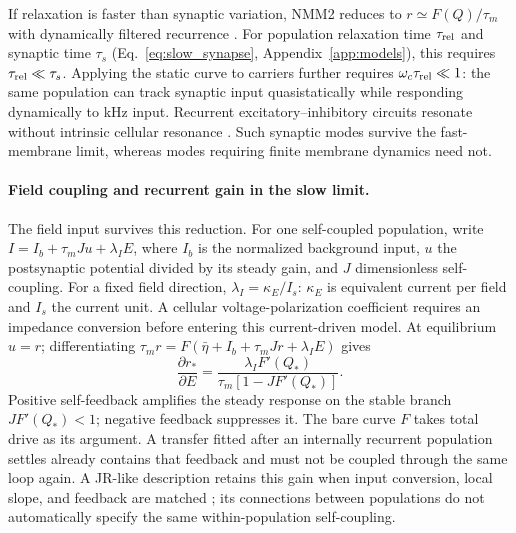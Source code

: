 If relaxation is faster than synaptic variation, NMM2 reduces to
$r\simeq F(Q)/\tau_m$ with dynamically filtered recurrence
\cite{ruffini2021nmm2,clusella2023}. For population relaxation time
$\tau_{\rm rel}$ and synaptic time $\tau_s$ (Eq.~\eqref{eq:slow_synapse},
Appendix~\ref{app:models}), this requires $\tau_{\rm rel}\ll\tau_s$.
Applying the static curve to carriers further requires
$\omega_c\tau_{\rm rel}\ll1$: the same population can track synaptic
input quasistatically while responding dynamically to kHz input.
Recurrent excitatory--inhibitory circuits resonate without intrinsic
cellular resonance \cite{brunelhakim1999,brunelwang2003}. Such synaptic
modes survive the fast-membrane limit, whereas modes requiring finite
membrane dynamics need not.

\paragraph{Field coupling and recurrent gain in the slow limit.}
The field input survives this reduction. For one self-coupled population,
write $I=I_b+\tau_mJu+\lambda_I E$, where $I_b$ is the normalized
background input, $u$ the postsynaptic potential divided by its steady gain, and $J$ dimensionless
self-coupling. For a fixed field direction, $\lambda_I=\kappa_E/I_s$:
$\kappa_E$ is equivalent current per field and $I_s$ the current unit.
A cellular voltage-polarization coefficient requires an impedance conversion
before entering this current-driven model. At equilibrium $u=r$;
differentiating $\tau_mr=F(\bar\eta+I_b+\tau_mJr+\lambda_IE)$ gives
\begin{equation}
\frac{\partial r_*}{\partial E}
=\frac{\lambda_I F'(Q_*)}{\tau_m[1-JF'(Q_*)]}.
\label{eq:slow-field-gain}
\end{equation}
Positive self-feedback amplifies the steady response on the stable branch
$JF'(Q_*)<1$; negative feedback suppresses it. The bare curve $F$ takes
total drive as its argument. A transfer fitted after an internally recurrent
population settles already contains that feedback and must not be coupled
through the same loop again. A JR-like description retains this gain when
input conversion, local slope, and feedback are matched
\cite{ruffini2021nmm2,clusella2023}; its connections between populations do
not automatically specify the same within-population self-coupling.

